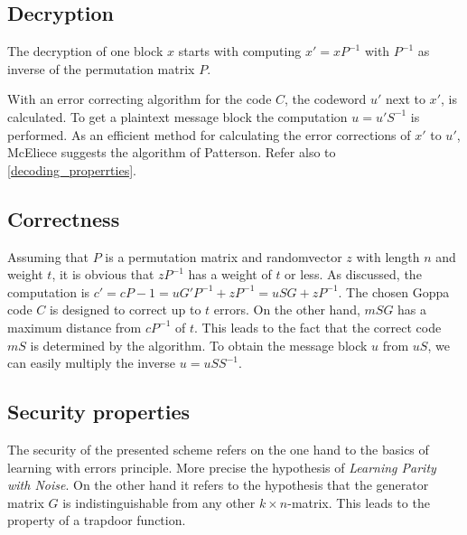 \subsection*{Decryption}
The decryption of one block $x$ starts with computing $x' = xP^{-1}$ with $P^{-1}$ as inverse of the permutation matrix $P$. 

With an error correcting algorithm for the code $C$, the codeword $u'$ next to $x'$, is calculated. 
To get a plaintext message block the computation $u = u'S^{-1}$ is performed\cite{wiki:mcelice}\cite{mceliece1978public}.
As an efficient method for calculating the error corrections of $x'$ to $u'$, McEliece suggests the algorithm of Patterson\cite{patterson1975algebraic}. Refer also to \autoref{decoding_properrties}. 


\subsection*{Correctness}
Assuming that $P$ is a permutation matrix and randomvector $z$ with length $n$ and weight $t$, it is obvious that $zP^{-1}$ has a weight of $t$ or less.
As discussed, the computation is $c' = c P - 1 = uG'P^{-1} + zP^{-1} = uSG + z P^{-1}$.
The chosen Goppa code $C$ is designed to correct up to $t$ errors. On the other hand, $mSG$ has a maximum distance from $cP^{-1}$ of $t$. This leads to the fact that the correct code $mS$ is determined by the algorithm. 
To obtain the message block $u$ from $uS$, we can easily multiply the inverse $u = uSS^{-1}$\cite{wiki:mcelice}.

\subsection*{Security properties}
The security of the presented scheme refers on the one hand to the basics of learning with errors principle. More precise the hypothesis of \textit{Learning Parity with Noise}\cite{pietrzak2012cryptography}. 
On the other hand it refers to the hypothesis that the generator matrix $G$ is indistinguishable from any other $k \times n$-matrix. This leads to the property of a trapdoor function.

